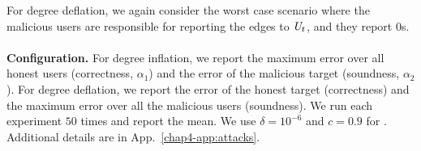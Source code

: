For degree deflation, we again consider the worst case scenario where the malicious users are responsible for reporting the edges to $\textit{U}_t$, and they report $0$s.
\\\\
\noindent \textbf{Configuration.} %
 For degree inflation, we report the maximum error over all honest users (correctness, $\alpha_1$) and the error of the malicious target (soundness, $\alpha_2$). For degree deflation, we report the error of the honest target (correctness) and the maximum error over all the malicious users (soundness). We run each experiment $50$ times and report the mean.  We use $\delta=10^{-6}$ and $c = 0.9$ for \DegHybrid{}. Additional details are in App.~\ref{chap4-app:attacks}. %

